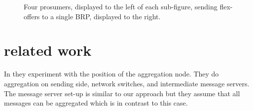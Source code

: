 \documentclass{ifacconf}
\begin{document}
\begin{figure}[]
   \centering
  \caption{Four prosumers, displayed to the left of each sub-figure, sending flex-offers to a single BRP, displayed to the right.}
  \label{fig:communicationservice}
\end{figure}



\section{related work}

In \cite{carmeli} they experiment with the position of the aggregation node. 
They do aggregation on sending side, network switches, and intermediate message servers.
The message server set-up is similar to our approach but they assume that all messages can be aggregated which is in contrast to this case.
\end{document}
